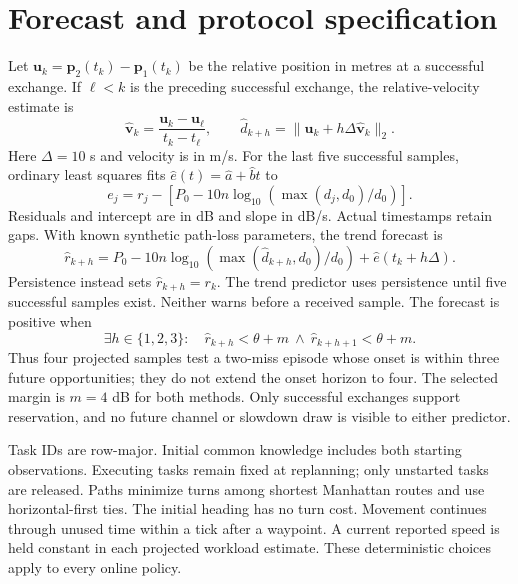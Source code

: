 \section{Forecast and protocol specification}\label{app:forecast}
Let $\boldsymbol u_k=\boldsymbol p_2(t_k)-\boldsymbol p_1(t_k)$ be the relative position in metres at a successful exchange. If $\ell<k$ is the preceding successful exchange, the relative-velocity estimate is
\begin{equation}
\widehat{\boldsymbol v}_k=\frac{\boldsymbol u_k-\boldsymbol u_\ell}{t_k-t_\ell},\qquad
\hat d_{k+h}=\|\boldsymbol u_k+h\Delta\widehat{\boldsymbol v}_k\|_2.
\end{equation}
Here $\Delta=10$ s and velocity is in m/s. For the last five successful samples, ordinary least squares fits $\hat e(t)=\hat a+\hat b t$ to
\begin{equation}
e_j=r_j-\left[P_0-10n\log_{10}\left(\max(d_j,d_0)/d_0\right)\right].
\end{equation}
Residuals and intercept are in dB and slope in dB/s. Actual timestamps retain gaps. With known synthetic path-loss parameters, the trend forecast is
\begin{equation}
\hat r_{k+h}=P_0-10n\log_{10}\left(\max(\hat d_{k+h},d_0)/d_0\right)+\hat e(t_k+h\Delta).
\end{equation}
Persistence instead sets $\hat r_{k+h}=r_k$. The trend predictor uses persistence until five successful samples exist. Neither warns before a received sample. The forecast is positive when
\begin{equation}
\exists h\in\{1,2,3\}:\quad
\hat r_{k+h}<\theta+m\ \land\ \hat r_{k+h+1}<\theta+m.
\end{equation}
Thus four projected samples test a two-miss episode whose onset is within three future opportunities; they do not extend the onset horizon to four. The selected margin is $m=4$ dB for both methods. Only successful exchanges support reservation, and no future channel or slowdown draw is visible to either predictor.

Task IDs are row-major. Initial common knowledge includes both starting observations. Executing tasks remain fixed at replanning; only unstarted tasks are released. Paths minimize turns among shortest Manhattan routes and use horizontal-first ties. The initial heading has no turn cost. Movement continues through unused time within a tick after a waypoint. A current reported speed is held constant in each projected workload estimate. These deterministic choices apply to every online policy.

